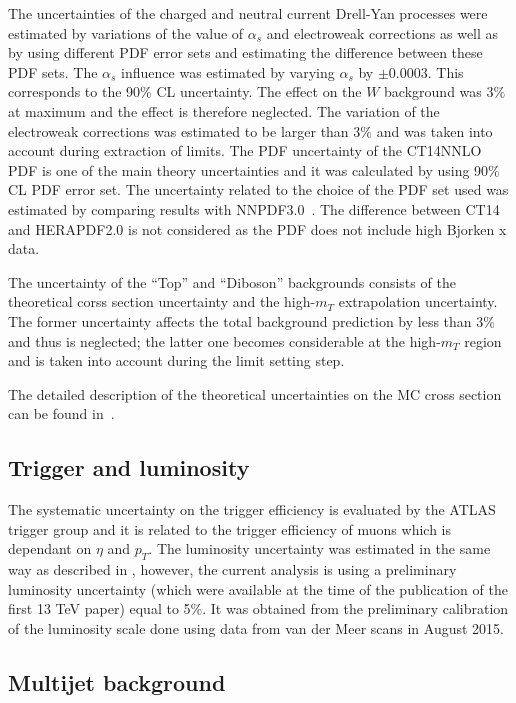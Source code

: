 The uncertainties of the charged and neutral current Drell-Yan processes were estimated by variations of the value of $\alpha_s$ and electroweak corrections as well as by using different PDF error sets and estimating the difference between these PDF sets.
The $\alpha_s$ influence was estimated by varying $\alpha_s$ by $\pm 0.0003$. This corresponds to the 90\% CL uncertainty. The effect on the $W$ background 
was $3\%$ at maximum and the effect is therefore neglected. 
The variation of the electroweak corrections was estimated to be larger than $3\%$ and was
taken into account during extraction of limits.
The PDF uncertainty of the CT14NNLO PDF is one of the main theory uncertainties
and it was calculated by using 90$\%$ CL PDF error set.
The uncertainty related to the choice of the PDF set used was estimated by comparing
results with NNPDF3.0~\cite{Ball:2014uwa}.
The difference between CT14 and HERAPDF2.0 is not considered as the PDF does not include high Bjorken x data. 

The uncertainty of the ``Top'' and ``Diboson'' backgrounds consists of the theoretical corss section uncertainty and the high-$m_T$ extrapolation uncertainty. The former uncertainty affects the total background
prediction by less than 3$\%$ and thus is neglected; the latter one becomes considerable at the high-$m_T$ region and is taken into account during the limit setting step.

The detailed description of the theoretical uncertainties on the MC cross section can be found in~\cite{Aaboud:2016zkn}.

\subsection{Trigger and luminosity}
The systematic uncertainty on the trigger efficiency is evaluated by the ATLAS trigger group and it is related to the trigger
efficiency of muons which is dependant on $\eta$ and $p_T$.
The luminosity uncertainty was estimated in the same way as described in , however, the current analysis is using a preliminary luminosity
uncertainty (which were available at the time of the publication of the first 13 TeV paper) equal to 5$\%$. It was obtained from the preliminary calibration of the luminosity scale done using data from van der Meer scans in August 2015.

\subsection{Multijet background}
\label{subsec:multijet_systematcs}

